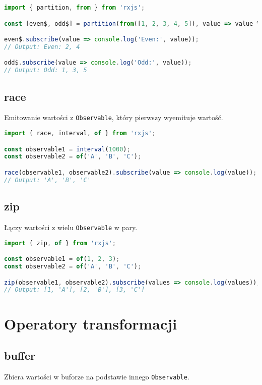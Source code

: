 \documentclass[a4paper,12pt]{article}
\begin{document}
\begin{lstlisting}[language=JavaScript, caption=Przykład użycia \texttt{partition}]
import { partition, from } from 'rxjs';

const [even$, odd$] = partition(from([1, 2, 3, 4, 5]), value => value % 2 === 0);

even$.subscribe(value => console.log('Even:', value));
// Output: Even: 2, 4

odd$.subscribe(value => console.log('Odd:', value));
// Output: Odd: 1, 3, 5
\end{lstlisting}

\subsection{race}
Emitowanie wartości z \texttt{Observable}, który pierwszy wyemituje wartość.

\begin{lstlisting}[language=JavaScript, caption=Przykład użycia \texttt{race}]
import { race, interval, of } from 'rxjs';

const observable1 = interval(1000);
const observable2 = of('A', 'B', 'C');

race(observable1, observable2).subscribe(value => console.log(value));
// Output: 'A', 'B', 'C'
\end{lstlisting}

\subsection{zip}
Łączy wartości z wielu \texttt{Observable} w pary.

\begin{lstlisting}[language=JavaScript, caption=Przykład użycia \texttt{zip}]
import { zip, of } from 'rxjs';

const observable1 = of(1, 2, 3);
const observable2 = of('A', 'B', 'C');

zip(observable1, observable2).subscribe(values => console.log(values));
// Output: [1, 'A'], [2, 'B'], [3, 'C']
\end{lstlisting}

\section{Operatory transformacji}
\subsection{buffer}
Zbiera wartości w buforze na podstawie innego \texttt{Observable}.
\end{document}
